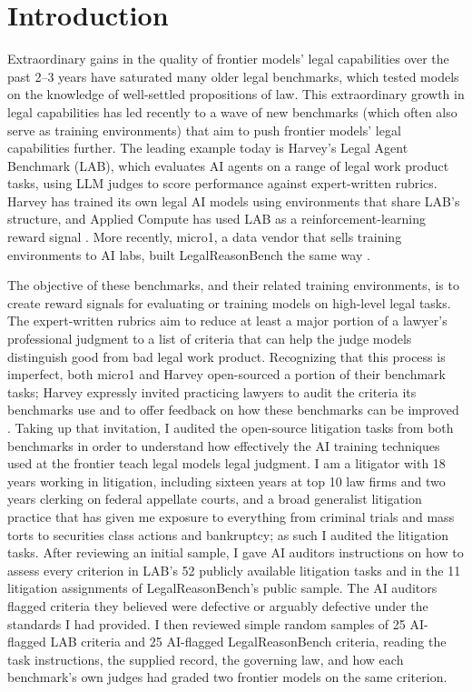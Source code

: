 \documentclass[11pt]{article}
\newcommand{\labTasks}{52}
\newcommand{\labSample}{25}
\newcommand{\lrbAssignments}{11}
\newcommand{\lrbSample}{25}
\begin{document}
\section{Introduction}

Extraordinary gains in the quality of frontier models' legal capabilities over the past 2--3 years have saturated many older legal benchmarks, which tested models on the knowledge of well-settled propositions of law. This extraordinary growth in legal capabilities has led recently to a wave of new benchmarks (which often also serve as training environments) that aim to push frontier models' legal capabilities further. The leading example today is Harvey's Legal Agent Benchmark (LAB), which evaluates AI agents on a range of legal work product tasks, using LLM judges to score performance against expert-written rubrics. Harvey has trained its own legal AI models using environments that share LAB's structure, and Applied Compute has used LAB as a reinforcement-learning reward signal \citep{harveyLAB,harveyTenet,appliedCompute}. More recently, micro1, a data vendor that sells training environments to AI labs, built LegalReasonBench the same way \citep{micro1LRB}.

The objective of these benchmarks, and their related training environments, is to create reward signals for evaluating or training models on high-level legal tasks. The expert-written rubrics aim to reduce at least a major portion of a lawyer's professional judgment to a list of criteria that can help the judge models distinguish good from bad legal work product. Recognizing that this process is imperfect, both micro1 and Harvey open-sourced a portion of their benchmark tasks; Harvey expressly invited practicing lawyers to audit the criteria its benchmarks use and to offer feedback on how these benchmarks can be improved \citep{harveyLAB}. Taking up that invitation, I audited the open-source litigation tasks from both benchmarks in order to understand how effectively the AI training techniques used at the frontier teach legal models legal judgment. I am a litigator with 18 years working in litigation, including sixteen years at top 10 law firms and two years clerking on federal appellate courts, and a broad generalist litigation practice that has given me exposure to everything from criminal trials and mass torts to securities class actions and bankruptcy; as such I audited the litigation tasks. After reviewing an initial sample, I gave AI auditors instructions on how to assess every criterion in LAB's \labTasks{} publicly available litigation tasks and in the \lrbAssignments{} litigation assignments of LegalReasonBench's public sample. The AI auditors flagged criteria they believed were defective or arguably defective under the standards I had provided. I then reviewed simple random samples of \labSample{} AI-flagged LAB criteria and \lrbSample{} AI-flagged LegalReasonBench criteria, reading the task instructions, the supplied record, the governing law, and how each benchmark's own judges had graded two frontier models on the same criterion.
\end{document}
